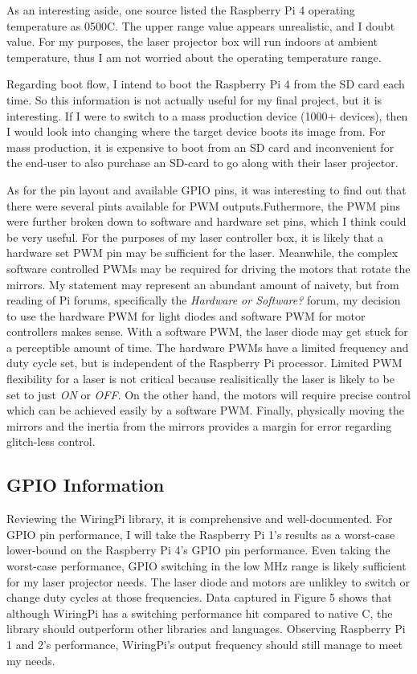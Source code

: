 \documentclass[journal]{IEEEtran}
\begin{document}
    As an interesting aside, one source listed the Raspberry Pi 4 operating temperature as 0\-500C.
    The upper range value appears unrealistic, and I doubt value. 
    For my purposes, the laser projector box will run indoors at ambient temperature, thus I am not worried about the operating temperature range.

    Regarding boot flow, I intend to boot the Raspberry Pi 4 from the SD card each time. 
    So this information is not actually useful for my final project, but it is interesting.
    If I were to switch to a mass production device (1000+ devices), then I would look into changing where the target device boots its image from.
    For mass production, it is expensive to boot from an SD card and inconvenient for the end-user to also purchase an SD-card to go along with their laser projector.
    
    As for the pin layout and available GPIO pins, it was interesting to find out that there were several pints available for PWM outputs.Futhermore, the PWM pins were further broken down to software and hardware set pins, which I think could be very useful.
    For the purposes of my laser controller box, it is likely that a hardware set PWM pin may be sufficient for the laser.
    Meanwhile, the complex software controlled PWMs may be required for driving the motors that rotate the mirrors.
    My statement may represent an abundant amount of naivety, but from reading of Pi forums, specifically the \emph{Hardware or Software?} forum, my decision to use the hardware PWM for light diodes and software PWM for motor controllers makes sense.
    With a software PWM, the laser diode may get stuck for a perceptible amount of time.
    The hardware PWMs have a limited frequency and duty cycle set, but is independent of the Raspberry Pi processor.
    Limited PWM flexibility for a laser is not critical because realisitically the laser is likely to be set to just \emph{ON} or \emph{OFF}.
    On the other hand, the motors will require precise control which can be achieved easily by a software PWM.
    Finally, physically moving the mirrors and the inertia from the mirrors provides a margin for error regarding glitch-less control.
    
    \subsection{GPIO Information}
    Reviewing the WiringPi library, it is comprehensive and well-documented. 
    For GPIO pin performance, I will take the Raspberry Pi 1's results as a worst-case lower-bound on the Raspberry Pi 4's GPIO pin performance.
    Even taking the worst-case performance, GPIO switching in the low MHz range is likely sufficient for my laser projector needs.
    The laser diode and motors are unlikley to switch or change duty cycles at those frequencies.
    Data captured in Figure 5 shows that although WiringPi has a switching performance hit compared to native C, the library should outperform other libraries and languages.
    Observing Raspberry Pi 1 and 2's performance, WiringPi's output frequency should still manage to meet my needs.
\end{document}
